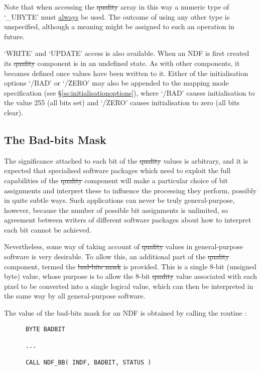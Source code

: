 Note that when accessing the \st{quality\/} array in this way a numeric type
of `\_UBYTE' must \underline{always} be used. 
The outcome of using any other type is unspecified, although a meaning might
be assigned to such an operation in future. 

`WRITE' and `UPDATE' access is also available.
When an NDF is first created its \st{quality\/} component is in an undefined
state.
As with other components, it becomes defined once values have been written
to it.
Either of the initialisation options `/BAD' or `/ZERO' may also be appended to
the mapping mode specification (see \S\ref{ss:initialisationoptions}), where
`/BAD' causes initialisation to the value 255 (all bits set) and `/ZERO'
causes initialisation to zero (all bits clear). 

\subsection{The Bad-bits Mask}

The significance attached to each bit of the \st{quality\/} values is arbitrary,
and it is expected that specialised software packages which need to exploit the
full capabilities of the \st{quality\/} component will make a particular choice
of bit assignments and interpret these to influence the processing they perform,
possibly in quite subtle ways. 
Such applications can never be truly general-purpose, however, because the
number of possible bit assignments is unlimited, so agreement between
writers of different software packages about how to interpret each bit
cannot be achieved. 

Nevertheless, some way of taking account of \st{quality\/} values in
general-purpose software is very desirable. 
To allow this, an additional part of the \st{quality\/} component, termed the
\st{bad-bits mask\/} is provided.
This is a single 8-bit (unsigned byte) value, whose purpose is to allow the 
8-bit \st{quality\/} value associated with each pixel to be converted into a
single logical value, which can then be interpreted in the same way by all 
general-purpose software.

The value of the bad-bits mask for an NDF is obtained by calling the routine 
:

\small
\begin{verbatim}
      BYTE BADBIT

      ...

      CALL NDF_BB( INDF, BADBIT, STATUS )
\end{verbatim}
\normalsize


